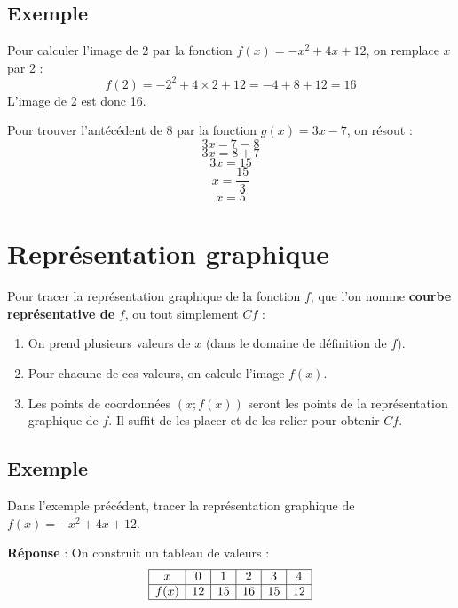 \documentclass[a4paper,12pt]{article}
\begin{document}
\subsection*{Exemple}
Pour calculer l'image de 2 par la fonction \( f(x) = -x^2 + 4x + 12 \), on remplace \( x \) par 2 :
\[
f(2) = -2^2 + 4 \times 2 + 12 = -4 + 8 + 12 = 16
\]
L'image de 2 est donc 16. \par
Pour trouver l'antécédent de 8 par la fonction \( g(x) = 3x - 7 \), on résout :
\[
3x - 7 = 8
\]
\[
3x = 8 + 7
\]
\[
3x = 15
\]
\[
x = \frac{15}{3}
\]
\[
x = 5
\]

\section*{Représentation graphique}
Pour tracer la représentation graphique de la fonction \( f \), que l'on nomme \textbf{courbe représentative de} \( f \), ou tout simplement \( Cf \) :
\begin{enumerate}
    \item On prend plusieurs valeurs de \( x \) (dans le domaine de définition de \( f \)).
    \item Pour chacune de ces valeurs, on calcule l'image \( f(x) \).
    \item Les points de coordonnées \( (x ; f(x)) \) seront les points de la représentation graphique de \( f \). Il suffit de les placer et de les relier pour obtenir \( Cf \).
\end{enumerate}

\subsection*{Exemple}
Dans l'exemple précédent, tracer la représentation graphique de \( f(x) = -x^2 + 4x + 12 \).

\textbf{Réponse} : On construit un tableau de valeurs :
\[
\begin{array}{|c|c|c|c|c|c|}
\hline
x & 0 & 1 & 2 & 3 & 4 \\
\hline
f(x) & 12 & 15 & 16 & 15 & 12 \\
\hline
\end{array}
\]
\end{document}
